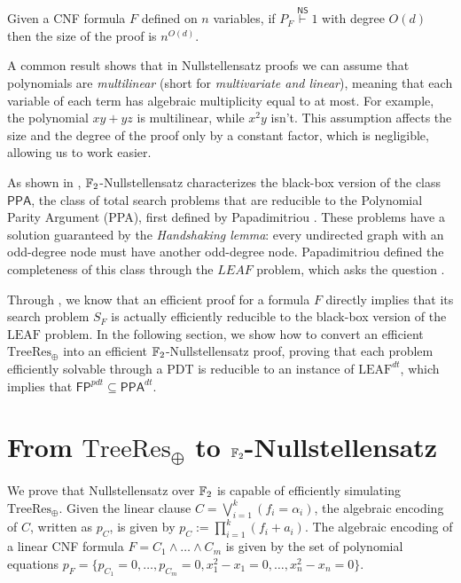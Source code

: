 \begin{proposition}
 Given a CNF formula $F$ defined on $n$ variables, if $P_F \stackrel{\mathsf{NS}}{\vdash} 1$ with degree $O(d)$ then the size of the proof is $n^{O(d)}$.
\end{proposition}

A common result shows that in Nullstellensatz proofs we can assume that polynomials are \textit{multilinear} (short for \textit{multivariate and linear}), meaning that each variable of each term has algebraic multiplicity equal to at most. For example, the polynomial $xy+yz$ is multilinear, while $x^2y$ isn't. This assumption affects the size and the degree of the proof only by a constant factor, which is negligible, allowing us to work easier.

As shown in , $\mathbb{F}_2$-Nullstellensatz characterizes the black-box version of the class $\mathsf{PPA}$, the class of total search problems that are reducible to the Polynomial Parity Argument (PPA), first defined by Papadimitriou \cite{PPA_complexity}. These problems have a solution guaranteed by the \textit{Handshaking lemma}: every undirected graph with an odd-degree node must have another odd-degree node. Papadimitriou defined the completeness of this class through the $LEAF$ problem, which asks the question .

Through , we know that an efficient proof for a formula $F$ directly implies that its search problem $S_F$ is actually efficiently reducible to the black-box version of the $\mathrm{LEAF}$ problem. In the following section, we show how to convert an efficient $\mathrm{TreeRes}_\oplus$ into an efficient $\mathbb{F}_2$-Nullstellensatz proof, proving that each problem efficiently solvable through a PDT is reducible to an instance of $\mathrm{LEAF}^{dt}$, which implies that $\mathsf{FP}^{pdt} \subseteq \mathsf{PPA}^{dt}$.

\section{From $\mathrm{TreeRes}_\oplus$ to $\mathbb{F}_2$-Nullstellensatz}

We prove that Nullstellensatz over $\mathbb{F}_2$ is capable of efficiently simulating $\mathrm{TreeRes}_\oplus$. Given the linear clause $C = \bigvee_{i = 1}^k (f_i = \alpha_i)$, the algebraic encoding of $C$, written as $p_C$, is given by $p_C := \prod_{i = 1}^{k} (f_i + a_i)$. The algebraic encoding of a linear CNF formula $F = C_1 \land \ldots \land C_m$ is given by the set of polynomial equations $p_F = \{p_{C_1} = 0, \ldots, p_{C_m} = 0, x_1^2-x_1 = 0, \ldots, x_n^2-x_n = 0\}$.

